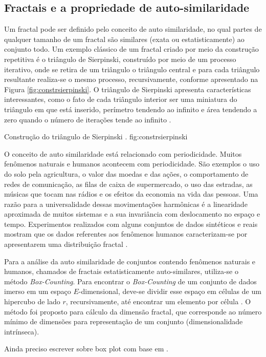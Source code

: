 \subsection{Fractais e a propriedade de auto-similaridade}
	\label{subsec:fractais}

Um fractal pode ser definido pelo conceito de auto similaridade, no qual partes
de qualquer tamanho de um fractal são similares (exata ou estatisticamente) ao
conjunto todo. Um exemplo clássico de um fractal criado por meio da construção
repetitiva é o triângulo de Sierpinski, construído por meio de um processo
iterativo, onde se retira de um triângulo o triângulo central e para cada
triângulo resultante realiza-se o mesmo processo, recursivamente, conforme
apresentado na Figura \ref{fig:constrsierpinski}. O triângulo de Sierpinski
apresenta características interessantes, como o fato de cada triângulo interior
ser uma miniatura do triângulo em que está inserido, perímetro tendendo ao
infinito e área tendendo a zero quando o número de iterações tende ao infinito
\cite{Schroeder91}. 

{Construção do triângulo de Sierpinski \cite{Schroeder91}.}
{fig:constrsierpinski}

O conceito de auto similaridade está relacionado com periodicidade. Muitos
fenômenos naturais e humanos acontecem com periodicidade. São exemplos o uso do
solo pela agricultura, o valor das moedas e das ações, o comportamento de redes
de comunicação, as filas de caixa de supermercado, o uso das estradas, as
músicas que tocam nas rádios e os efeitos da economia na vida das pessoas. Uma
razão para a universalidade dessas movimentações harmônicas é a linearidade
aproximada de muitos sistemas e a sua invariância com deslocamento no espaço e
tempo. Experimentos realizados com alguns conjuntos de dados sintéticos e reais
mostram que os dados referentes aos fenômenos humanos caracterizam-se por
apresentarem uma distribuição fractal \cite{Traina2010}.

Para a análise da auto similaridade de conjuntos contendo fenômenos naturais e
humanos, chamados de fractais estatisticamente auto-similares, utiliza-se o
método \textit{Box-Counting}. Para encontrar o \textit{Box-Counting} de um
conjunto de dados imerso em um espaço $E$-dimensional, deve-se dividir esse
espaço em células de um hipercubo de lado $r$, recursivamente, até encontrar um
elemento por célula \cite{Traina2010}. O método foi proposto para cálculo da
dimensão fractal, que corresponde ao número mínimo de dimensões para
representação de um conjunto (dimensionalidade intrínseca). 

Ainda preciso escrever sobre box plot com base em \cite{Traina2010}.